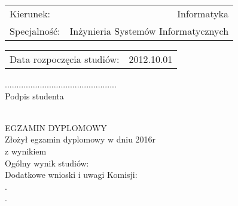 \begin{minipage}{0.75\textwidth}
    \begin{flushleft} \normalsize
        \def\arraystretch{2}
            \begin{tabular}{ p{3cm} r }
                Kierunek: & Informatyka \\
                Specjalność: & Inżynieria Systemów Informatycznych\\

            \end{tabular}
            \begin{tabular}{ p{8cm} r}
                Data rozpoczęcia studiów: & 2012.10.01 \\
            \end{tabular}
    \end{flushleft}
\end{minipage}

\vfill

\begin{flushright}
    \begin{minipage}{5.8cm}
        \begin{center}
            ................................................\\
            Podpis studenta
        \end{center}
    \end{minipage}
\end{flushright}

~\\[0.5cm]

\noindent
EGZAMIN DYPLOMOWY\\
Złożył egzamin dyplomowy w dniu \dotfill 2016r\\
z wynikiem \dotfill \\
Ogólny wynik studiów: \dotfill \\
Dodatkowe wnioski i uwagi Komisji: \dotfill \\
.\dotfill \\
.\dotfill \\
